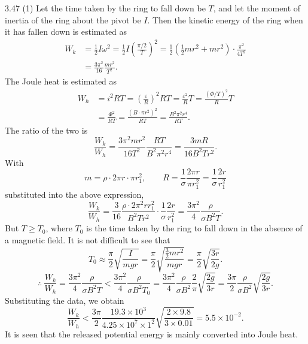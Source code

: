 \begin{solution}{3.47}
(1) Let the time taken by the ring to fall down be $T$, and let the moment of inertia of the ring about the pivot be $I$. Then the kinetic energy of the ring when it has fallen down is estimated as
\begin{align*}
W_k &= \frac{1}{2}I\omega^2=\frac{1}{2}I\left(\frac{\pi/2}{T}\right)^2
=\frac{1}{2}\left(\frac{1}{2}mr^2+mr^2\right)\cdot\frac{\pi^2}{4T^2}\\
&= \frac{3\pi^2}{16}\frac{mr^2}{T^2}.
\end{align*}
The Joule heat is estimated as
\begin{align*}
W_h &= i^2RT=\left(\frac{\varepsilon}{R}\right)^2RT=\frac{\varepsilon^2}{R}T=\frac{(\Phi/T)^2}{R}T\\
&= \frac{\Phi^2}{RT}=\frac{(B\cdot\pi r^2)^2}{RT}=\frac{B^2\pi^2r^4}{RT}.
\end{align*}
The ratio of the two is
\[
\frac{W_k}{W_h}=\frac{3\pi^2mr^2}{16T^2}\frac{RT}{B^2\pi^2r^4}=\frac{3mR}{16B^2Tr^2}.
\]
With
\[
m=\rho\cdot2\pi r\cdot\pi r_1^2,\qquad
R=\frac{1}{\sigma}\frac{2\pi r}{\pi r_1^2}=\frac{1}{\sigma}\frac{2r}{r_1^2}
\]
substituted into the above expression,
\[
\frac{W_k}{W_h}=\frac{3}{16}\frac{\rho\cdot2\pi^2rr_1^2}{B^2Tr^2}\cdot\frac{1}{\sigma}\frac{2r}{r_1^2}
=\frac{3\pi^2}{4}\frac{\rho}{\sigma B^2T}.
\]
But $T\geqslant T_0$, where $T_0$ is the time taken by the ring to fall down in the absence of a magnetic field. It is not difficult to see that
\[
T_0\approx\frac{\pi}{2}\sqrt{\frac{I}{mgr}}=\frac{\pi}{2}\sqrt{\frac{\frac{3}{2}mr^2}{mgr}}=\frac{\pi}{2}\sqrt{\frac{3r}{2g}}.
\]
\[
\therefore\ \frac{W_k}{W_h}=\frac{3\pi^2}{4}\frac{\rho}{\sigma B^2T}
<\frac{3\pi^2}{4}\frac{\rho}{\sigma B^2T_0}
=\frac{3\pi^2}{4}\frac{\rho}{\sigma B^2}\frac{2}{\pi}\sqrt{\frac{2g}{3r}}
=\frac{3\pi}{2}\frac{\rho}{\sigma B^2}\sqrt{\frac{2g}{3r}}.
\]
Substituting the data, we obtain
\[
\frac{W_k}{W_h}<\frac{3\pi}{2}\frac{19.3\times10^3}{4.25\times10^7\times1^2}\sqrt{\frac{2\times9.8}{3\times0.01}}=5.5\times10^{-2}.
\]
It is seen that the released potential energy is mainly converted into Joule heat.


\end{solution}
